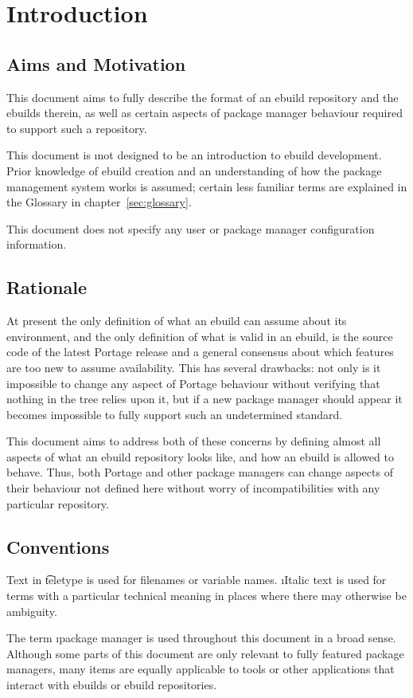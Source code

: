 \chapter{Introduction}

\section{Aims and Motivation}

This document aims to fully describe the format of an ebuild repository and the ebuilds therein, as
well as certain aspects of package manager behaviour required to support such a repository.

This document is \i{not} designed to be an introduction to ebuild development. Prior knowledge of
ebuild creation and an understanding of how the package management system works is assumed; certain
less familiar terms are explained in the Glossary in chapter~\ref{sec:glossary}.

This document does not specify any user or package manager configuration information.

\section{Rationale}

At present the only definition of what an ebuild can assume about its environment,
and the only definition of what is valid in an ebuild, is the source code of the latest Portage release
and a general consensus about which features are too new to assume availability. This has several
drawbacks: not only is it impossible to change any aspect of Portage behaviour without verifying
that nothing in the tree relies upon it, but if a new package manager should appear it becomes
impossible to fully support such an undetermined standard.

This document aims to address both of these concerns by defining almost all aspects of what an
ebuild repository looks like, and how an ebuild is allowed to behave. Thus, both Portage and other
package managers can change aspects of their behaviour not defined here without worry of
incompatibilities with any particular repository.

\section{Conventions}

Text in \t{teletype} is used for filenames or variable names. \i{Italic} text is used for terms
with a particular technical meaning in places where there may otherwise be ambiguity.

The term \i{package manager} is used throughout this document in a broad sense. Although some parts
of this document are only relevant to fully featured package managers, many items are equally
applicable to tools or other applications that interact with ebuilds or ebuild repositories.


